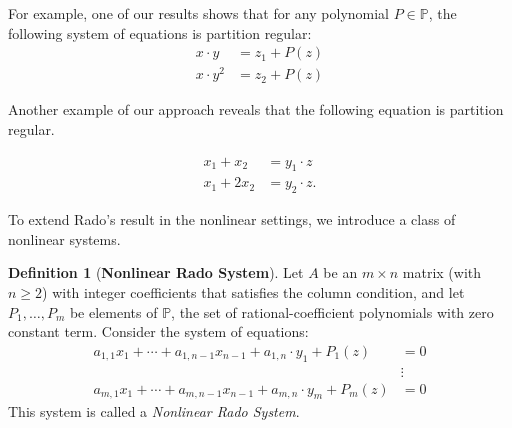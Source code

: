 \documentclass{article}
\theoremstyle{Theorem}
\theoremstyle{definition}
\newtheorem{defn}[thm]{Definition}
\begin{document}
 For example, one of our results shows that for any polynomial \( P \in \mathbb{P} \), the following system of equations is partition regular:
\[
\begin{aligned}
    x \cdot y &= z_1 + P(z) \\
    x \cdot y^2 &= z_2 + P(z)
\end{aligned}
\]

Another example of our approach reveals that the following equation is partition regular.

\[
\begin{aligned}
    x_1 + x_2 &= y_1\cdot z \\
    x_1 + 2x_2 &= y_2\cdot z.
\end{aligned}
\]

\medskip

To extend Rado's result in the nonlinear settings, we introduce a class of nonlinear systems.
\begin{defn}[\textbf{Nonlinear Rado System}]\label{newdef}
    Let \( A \) be an \( m \times n \) matrix (with \( n \geq 2 \)) with integer coefficients that satisfies the column condition, and let \( P_1, \ldots, P_m \) be elements of \( \mathbb{P} \), the set of rational-coefficient polynomials with zero constant term. Consider the system of equations:
    \begin{align*}
        a_{1,1}x_1 + \cdots + a_{1,n-1}x_{n-1} + a_{1,n} \cdot y_1 + P_1(z) &= 0 \\
        &\vdots \\
        a_{m,1}x_1 + \cdots + a_{m,n-1}x_{n-1} + a_{m,n} \cdot y_m + P_m(z) &= 0
    \end{align*}
    This system is called a \emph{Nonlinear Rado System}.
\end{defn}
\end{document}
